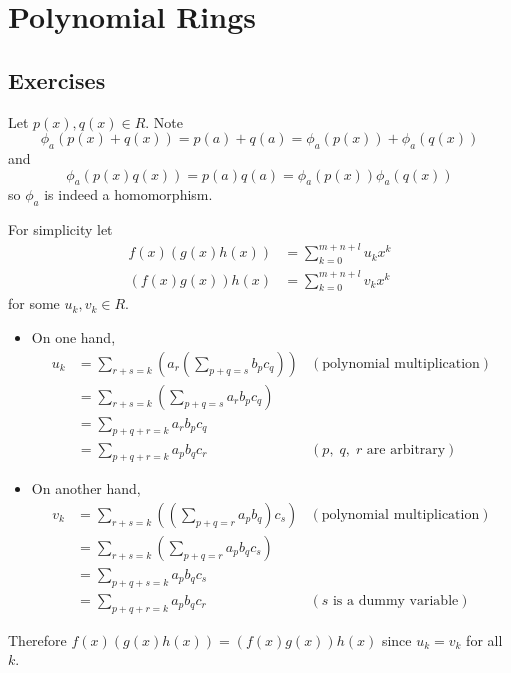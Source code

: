 \section{Polynomial Rings}
\subsection*{Exercises}
\begin{questions}
    \item Let $p(x), q(x) \in R$. Note
    \[
        \phi_a(p(x)+q(x)) = p(a) + q(a) = \phi_a(p(x)) + \phi_a(q(x))
    \]
    and
    \[
        \phi_a(p(x)q(x)) = p(a)q(a) = \phi_a(p(x))\phi_a(q(x))
    \]
    so $\phi_a$ is indeed a homomorphism.

    \item For simplicity let
    \begin{align*}
        f(x)(g(x)h(x)) &= \sum_{k=0}^{m+n+l}u_kx^k\\
        (f(x)g(x))h(x) &= \sum_{k=0}^{m+n+l}v_kx^k
    \end{align*}
    for some $u_k, v_k \in R$.
    \begin{itemize}
        \item On one hand,
        \begin{align*}
            u_k &= \sum_{r+s=k}\left(a_r\left(\sum_{p+q=s}b_pc_q\right)\right) & (\text{polynomial multiplication})\\
            &= \sum_{r+s=k}\left(\sum_{p+q=s}a_rb_pc_q\right)\\
            &= \sum_{p+q+r=k}a_rb_pc_q\\
            &= \sum_{p+q+r=k}a_pb_qc_r & (p,\;q,\;r \text{ are arbitrary})
        \end{align*}

        \item On another hand,
        \begin{align*}
            v_k &= \sum_{r+s=k}\left(\left(\sum_{p+q=r}a_pb_q\right)c_s\right) & (\text{polynomial multiplication})\\
            &= \sum_{r+s=k}\left(\sum_{p+q=r}a_pb_qc_s\right)\\
            &= \sum_{p+q+s=k}a_pb_qc_s\\
            &= \sum_{p+q+r=k}a_pb_qc_r & (s \text{ is a dummy variable})
        \end{align*}
    \end{itemize}
    Therefore $f(x)(g(x)h(x)) = (f(x)g(x))h(x)$ since $u_k = v_k$ for all $k$.


\end{questions}
